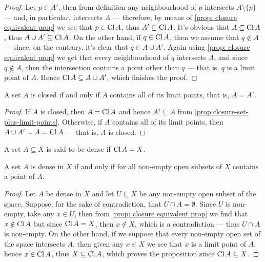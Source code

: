 \begin{proof}
Let \(p \in A'\), then from definition any neighbourhood of \(p\) intersects
\(A \setminus \{p\}\) --- and, in particular, intersects \(A\) --- therefore, by
means of \cref{prop: closure equivalent prop} we see that \(p \in
\operatorname{Cl} A\), thus \(A' \subseteq \operatorname{Cl} A\). It's obvious that \(A
\subseteq \operatorname{Cl} A\), thus \(A \cup A' \subseteq \operatorname{Cl} A\). On the
other hand, if \(q \in \operatorname{Cl} A\), then we assume that \(q \notin A\) ---
since, on the contrary, it's clear that \(q \in A \cup A'\). Again using
\cref{prop: closure equivalent prop} we get that every neighbourhood of \(q\)
intersects \(A\), and since \(q \notin A\), then the intersection contains a
point other than \(q\) --- that is, \(q\) is a limit point of \(A\). Hence
\(\operatorname{Cl} A \subseteq A \cup A'\), which finishes the proof.
\end{proof}

\begin{corollary}
\label{cor:closed-limit-points}
A set \(A\) is closed if and only if \(A\) contains all of its limit points,
that is, \(A = A'\).
\end{corollary}

\begin{proof}
If \(A\) is closed, then \(A = \operatorname{Cl} A\) and hence \(A' \subseteq A\) from
\cref{prop:closure-set-plus-limit-points}. Otherwise, if \(A\) contains all of
its limit points, then \(A \cup A' = A = \operatorname{Cl} A\) --- that is, \(A\) is
closed.
\end{proof}

\begin{definition}
\label{def:dense-set}
A set \(A \subseteq X\) is said to be dense if \(\operatorname{Cl} A = X\).
\end{definition}

\begin{proposition}
\label{prop:dense-non-empty-intersects}
A set \(A\) is dense in \(X\) if and only if for all non-empty open subsets of
\(X\) contains a point of \(A\).
\end{proposition}

\begin{proof}
Let \(A\) be dense in \(X\) and let \(U \subseteq X\) be any non-empty
open subset of the space. Suppose, for the sake of contradiction, that \(U \cap
A = \emptyset\). Since \(U\) is non-empty, take any \(x \in U\), then from
\cref{prop: closure equivalent prop} we find that \(x \notin \operatorname{Cl} A\) but
since \(\operatorname{Cl} A = X\), then \(x \notin X\), which is a contradiction ---
thus \(U \cap A\) is non-empty. On the other hand, if we suppose that every
non-empty open set of the space intersects \(A\), then given any \(x \in X\) we
see that \(x\) is a limit point of \(A\), hence \(x \in \operatorname{Cl} A\), thus \(X
\subseteq \operatorname{Cl} A\), which proves the proposition since \(\operatorname{Cl} A
\subseteq X\).
\end{proof}

